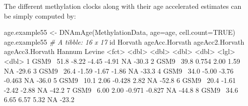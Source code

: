 \documentclass[]{article}
\newcommand{\hlnum}[1]{\textcolor[rgb]{0.816,0.125,0.439}{#1}}%
\newcommand{\hlstr}[1]{\textcolor[rgb]{0.251,0.627,0.251}{#1}}%
\newcommand{\hlcom}[1]{\textcolor[rgb]{0.502,0.502,0.502}{\textit{#1}}}%
\newcommand{\hlopt}[1]{\textcolor[rgb]{0,0,0}{#1}}%
\newcommand{\hlstd}[1]{\textcolor[rgb]{0.251,0.251,0.251}{#1}}%
\newcommand{\hlkwc}[1]{\textcolor[rgb]{0.251,0.251,0.251}{#1}}%
\newcommand{\hlkwd}[1]{\textcolor[rgb]{0.878,0.439,0.125}{#1}}%
\newenvironment{Shaded}{\begin{myshaded}}{\end{myshaded}}
\newcommand{\KeywordTok}[1]{\hlkwd{#1}}
\newcommand{\DataTypeTok}[1]{\hlkwc{#1}}
\newcommand{\DecValTok}[1]{\hlnum{#1}}
\newcommand{\FloatTok}[1]{\hlnum{#1}}
\newcommand{\StringTok}[1]{\hlstr{#1}}
\newcommand{\CommentTok}[1]{\hlcom{#1}}
\newcommand{\OtherTok}[1]{{#1}}
\newcommand{\OperatorTok}[1]{\hlopt{#1}}
\newcommand{\ErrorTok}[1]{\textcolor{errorcolor}{#1}}
\newcommand{\NormalTok}[1]{\hlstd{#1}}
\begin{document}
The different methylation clocks along with their age accelerated estimates can be simply computed by:

\begin{Shaded}
\begin{Highlighting}[]
\NormalTok{age.example55 <-}\StringTok{ }\KeywordTok{DNAmAge}\NormalTok{(MethylationData, }\DataTypeTok{age=}\NormalTok{age, }
                         \DataTypeTok{cell.count=}\OtherTok{TRUE}\NormalTok{)}
\NormalTok{age.example55}
  \CommentTok{# A tibble: 16 x 17}
\NormalTok{     id    Horvath ageAcc.Horvath ageAcc2.Horvath ageAcc3.Horvath Hannum Levine}
     \OperatorTok{<}\NormalTok{fct}\OperatorTok{>}\StringTok{   }\ErrorTok{<}\NormalTok{dbl}\OperatorTok{>}\StringTok{          }\ErrorTok{<}\NormalTok{dbl}\OperatorTok{>}\StringTok{           }\ErrorTok{<}\NormalTok{dbl}\OperatorTok{>}\StringTok{           }\ErrorTok{<}\NormalTok{dbl}\OperatorTok{>}\StringTok{ }\ErrorTok{<}\NormalTok{lgl}\OperatorTok{>}\StringTok{   }\ErrorTok{<}\NormalTok{dbl}\OperatorTok{>}
\StringTok{   }\DecValTok{1}\NormalTok{ GSM9}\OperatorTok{~}\StringTok{   }\FloatTok{51.8}          \FloatTok{-8.22}          \FloatTok{-4.45}            \FloatTok{-4.91}  \OtherTok{NA}      \FloatTok{-30.3}
   \DecValTok{2}\NormalTok{ GSM9}\OperatorTok{~}\StringTok{   }\FloatTok{39.8}           \FloatTok{0.754}          \FloatTok{2.00}             \FloatTok{1.59}  \OtherTok{NA}      \FloatTok{-29.6}
   \DecValTok{3}\NormalTok{ GSM9}\OperatorTok{~}\StringTok{   }\FloatTok{26.4}          \FloatTok{-1.59}          \FloatTok{-1.67}            \FloatTok{-1.86}  \OtherTok{NA}      \FloatTok{-33.3}
   \DecValTok{4}\NormalTok{ GSM9}\OperatorTok{~}\StringTok{   }\FloatTok{34.0}          \FloatTok{-5.00}          \FloatTok{-3.76}            \FloatTok{-0.463} \OtherTok{NA}      \FloatTok{-36.0}
   \DecValTok{5}\NormalTok{ GSM9}\OperatorTok{~}\StringTok{   }\FloatTok{10.1}           \FloatTok{2.06}          \FloatTok{-0.428}            \FloatTok{2.82}  \OtherTok{NA}      \FloatTok{-52.8}
   \DecValTok{6}\NormalTok{ GSM9}\OperatorTok{~}\StringTok{   }\FloatTok{20.4}          \FloatTok{-1.61}          \FloatTok{-2.42}            \FloatTok{-2.88}  \OtherTok{NA}      \FloatTok{-42.2}
   \DecValTok{7}\NormalTok{ GSM9}\OperatorTok{~}\StringTok{    }\FloatTok{6.00}          \FloatTok{2.00}          \FloatTok{-0.971}           \FloatTok{-0.827} \OtherTok{NA}      \FloatTok{-44.8}
   \DecValTok{8}\NormalTok{ GSM9}\OperatorTok{~}\StringTok{   }\FloatTok{34.6}           \FloatTok{6.65}           \FloatTok{6.57}             \FloatTok{5.32}  \OtherTok{NA}      \FloatTok{-23.2}

\end{Highlighting}
\end{Shaded}
\end{document}
